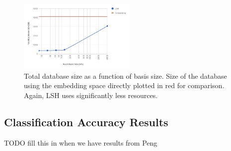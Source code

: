 \begin{figure}[h!]
    \centering
    \includegraphics[width=0.5\textwidth]{images/hashing_memory_results.png}
    \caption{Total database size as a function of basis size. Size of the database using the embedding space directly plotted in red for comparison. Again, LSH uses significantly less resources.}
    \label{fig:memres}
\end{figure}

\subsection{Classification Accuracy Results}

TODO fill this in when we have results from Peng


